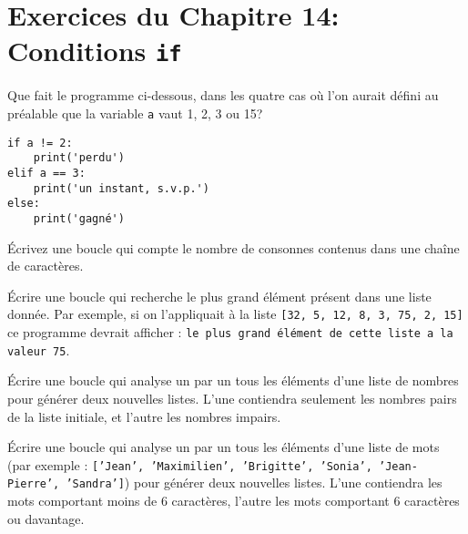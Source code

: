 
\section*{Exercices du Chapitre 14: Conditions \texttt{if}}

\begin{question}
Que fait le programme ci-dessous, dans les quatre cas où l'on aurait défini au
préalable que la variable \texttt{a} vaut 1, 2, 3 ou 15?
\begin{verbatim}
if a != 2: 
    print('perdu')
elif a == 3:
    print('un instant, s.v.p.')
else: 
    print('gagné')
\end{verbatim}
\end{question}

\begin{exercice}
Écrivez une boucle qui compte le nombre de consonnes contenus dans une chaîne de
caractères.
\end{exercice}

\begin{exercice}
Écrire une boucle qui recherche le plus grand élément présent dans une liste
donnée. Par exemple, si on l’appliquait à la liste \texttt{[32, 5, 12, 8, 3, 75,
2, 15]} ce programme devrait afficher : \texttt{le plus grand élément de cette liste a
la valeur 75}.
\end{exercice}

\begin{question}
Écrire une boucle qui analyse un par un tous les éléments d'une liste de nombres
pour générer deux nouvelles listes. L'une contiendra seulement les nombres pairs
de la liste initiale, et l'autre les nombres impairs.
\end{question}

\begin{exercice}
Écrire une boucle qui analyse un par un tous les éléments d’une liste de mots
(par exemple : \texttt{['Jean', 'Maximilien', 'Brigitte', 'Sonia',
'Jean-Pierre', 'Sandra']}) pour générer deux nouvelles listes. L’une contiendra
les mots comportant moins de 6 caractères, l’autre les mots comportant 6
caractères ou davantage.
\end{exercice}


